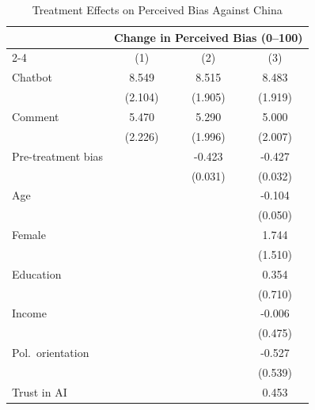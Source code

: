 \begin{table}[htbp]
\centering
\caption{Treatment Effects on Perceived Bias Against China}
\label{tab:bias}
\begin{tabular}{l*{3}{c}}
\toprule
 & \multicolumn{3}{c}{Change in Perceived Bias (0--100)} \\
\cmidrule(lr){2-4}
 & (1) & (2) & (3) \\
\midrule
Chatbot             &       8.549\sym{***}&       8.515\sym{***}&       8.483\sym{***}\\
                    &     (2.104)         &     (1.905)         &     (1.919)         \\
\addlinespace
Comment             &       5.470\sym{**} &       5.290\sym{***}&       5.000\sym{**} \\
                    &     (2.226)         &     (1.996)         &     (2.007)         \\
\addlinespace
Pre-treatment bias  &                     &      -0.423\sym{***}&      -0.427\sym{***}\\
                    &                     &     (0.031)         &     (0.032)         \\
\addlinespace
Age                 &                     &                     &      -0.104\sym{**} \\
                    &                     &                     &     (0.050)         \\
\addlinespace
Female              &                     &                     &       1.744         \\
                    &                     &                     &     (1.510)         \\
\addlinespace
Education           &                     &                     &       0.354         \\
                    &                     &                     &     (0.710)         \\
\addlinespace
Income              &                     &                     &      -0.006         \\
                    &                     &                     &     (0.475)         \\
\addlinespace
Pol.\ orientation   &                     &                     &      -0.527         \\
                    &                     &                     &     (0.539)         \\
\addlinespace
Trust in AI         &                     &                     &       0.453         \\

\end{tabular}
\end{table}
